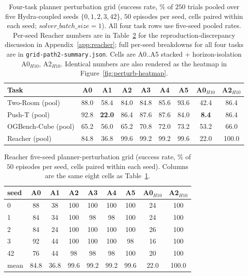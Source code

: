 \documentclass{article}
\begin{document}
\begin{table}[ht]
\centering\small
\caption{Four-task planner perturbation grid (success rate, \% of $250$ trials pooled over five Hydra-coupled seeds $\{0,1,2,3,42\}$, $50$ episodes per seed, cells paired within each seed; $\mathit{solver\_batch\_size}=1$). All four task rows use five-seed pooled rates. Per-seed Reacher numbers are in Table~\ref{tab:reacher-5seed} for the reproduction-discrepancy discussion in Appendix~\ref{app:reacher}; full per-seed breakdowns for all four tasks are in \texttt{grid-path2-summary.json}. Cells are A0..A5 stacked + horizon-isolation A0$_{H10}$, A2$_{H10}$. Identical numbers are also rendered as the heatmap in Figure~\ref{fig:perturb-heatmap}.}
\label{tab:perturb}
\begin{tabular}{lcccccccc}
\toprule
Task & A0 & A1 & A2 & A3 & A4 & A5 & A0$_{H10}$ & A2$_{H10}$ \\
\midrule
Two-Room (pool)         & 88.0 & 58.4 & 84.0 & 84.8 & 85.6 & 93.6 & 42.4 & 86.4 \\
Push-T (pool)           & 92.8 & \textbf{22.0} & 86.4 & 87.6 & 87.6 & 84.0 & \textbf{8.4}  & 86.4 \\
OGBench-Cube (pool)     & 65.2 & 56.0 & 65.2 & 70.8 & 72.0 & 73.2 & 53.2 & 66.0 \\
Reacher (pool)          & 84.8 & 36.8 & 99.6 & 99.2 & 99.2 & 99.6 & 22.0 & 100.0 \\
\bottomrule
\end{tabular}
\end{table}

\begin{table}[ht]
\centering\small
\caption{Reacher five-seed planner-perturbation grid (success rate, \% of $50$ episodes per seed, cells paired within each seed). Columns are the same eight cells as Table~\ref{tab:perturb}.}
\label{tab:reacher-5seed}
\begin{tabular}{lcccccccc}
\toprule
seed & A0 & A1 & A2 & A3 & A4 & A5 & A0$_{H10}$ & A2$_{H10}$ \\
\midrule
0   & 88 & 38 & 100 & 100 & 100 & 100 & 24 & 100 \\
1   & 84 & 34 & 100 &  98 &  98 & 100 & 24 & 100 \\
2   & 84 & 24 & 100 & 100 & 100 & 100 & 26 & 100 \\
3   & 92 & 44 & 100 & 100 & 100 &  98 & 16 & 100 \\
42  & 76 & 44 &  98 &  98 &  98 & 100 & 20 & 100 \\
\midrule
mean & 84.8 & 36.8 & 99.6 & 99.2 & 99.2 & 99.6 & 22.0 & 100.0 \\
\bottomrule
\end{tabular}
\end{table}
\end{document}

